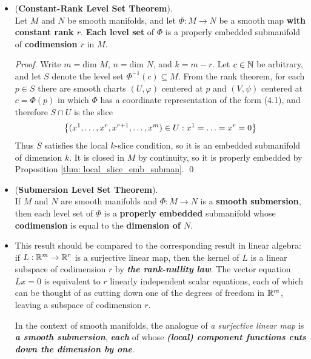 \documentclass[11pt]{article}
\begin{document}
\begin{itemize}
\item \begin{theorem} (\textbf{Constant-Rank Level Set Theorem}). \citep{lee2003introduction} \\
Let $M$ and $N$ be smooth manifolds, and let $\Phi: M \rightarrow N$ be a smooth map \textbf{with constant rank $r$}. \textbf{Each level set} of $\Phi$ is a properly embedded submanifold of \textbf{codimension $r$} in $M$.
\end{theorem}
\begin{proof}
Write $m = \text{dim }M$, $n = \text{dim }N$, and $k = m - r$. Let $c \in {\mathbb N}$ be arbitrary, and let $S$ denote the level set $\Phi^{-1}(c) \subseteq M$. From the rank theorem, for each $p \in S$ there are smooth charts $(U, \varphi)$ centered at $p$ and $(V, \psi)$ centered at $c = \Phi(p)$ in which $\Phi$ has a coordinate representation of the form (4.1), and therefore $S \cap U$ is the slice
\begin{align*}
\left\{(x^1,\ldots,x^r, x^{r+1},\ldots,x^m) \in U:  x^1 = \ldots = x^r = 0\right\}
\end{align*}
Thus $S$ satisfies the local $k$-slice condition, so it is an embedded submanifold of dimension $k$. It is closed in $M$ by continuity, so it is properly embedded by Proposition \ref{thm: local_slice_emb_subman}. \qed 
\end{proof}

\item \begin{corollary} (\textbf{Submersion Level Set Theorem}). \citep{lee2003introduction} \\
 If $M$ and $N$ are smooth manifolds and $\Phi: M \rightarrow N$ is a \textbf{smooth submersion}, then each level set of $\Phi$ is a \textbf{properly embedded} submanifold whose \textbf{codimension} is equal to the \textbf{dimension of $N$}.
\end{corollary}

\item \begin{remark}
This result should be compared to the corresponding result in linear algebra: if $L: {\mathbb R}^m \rightarrow {\mathbb R}^r$ is a surjective linear map, then the kernel of $L$ is a linear subspace of codimension $r$ by \emph{\textbf{the rank-nullity law}}.  The vector equation $Lx = 0$ is equivalent to $r$ linearly independent scalar equations, each of which can be thought of as cutting down one of the degrees of freedom in ${\mathbb R}^m$, leaving a subspace of codimension $r$. 

In the context of smooth manifolds, the analogue of \emph{a surjective linear map} is \emph{\textbf{a smooth submersion}}, \emph{\textbf{each}} of whose \emph{\textbf{(local) component functions cuts down the dimension by one}}.
\end{remark}



\end{itemize}
\end{document}
